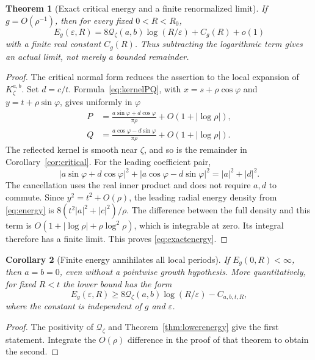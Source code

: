 \documentclass[11pt,a4paper]{article}
\numberwithin{equation}{section}
\newtheorem{theorem}{Theorem}[section]
\newtheorem{corollary}[theorem]{Corollary}
\theoremstyle{definition}
\theoremstyle{remark}
\newcommand{\qf}{\mathcal Q}
\begin{document}
\begin{theorem}[Exact critical energy and a finite renormalized limit]
\label{thm:exactenergy}
If $g=O(\rho^{-1})$, then for every fixed $0<R<R_0$,
\begin{equation}
 E_g(\varepsilon,R)
 =8\qf_\zeta(a,b)\log(R/\varepsilon)+C_g(R)+o(1)
 \label{eq:exactenergy}
\end{equation}
with a finite real constant $C_g(R)$. Thus subtracting the logarithmic
term gives an actual limit, not merely a bounded remainder.
\end{theorem}
\begin{proof}
The critical normal form reduces the assertion to the local expansion of
$K_\zeta^{a,b}$. Set $d=c/t$. Formula~\eqref{eq:kernelPQ}, with
$x=s+\rho\cos\varphi$ and $y=t+\rho\sin\varphi$, gives uniformly in
$\varphi$
\begin{align}
 P&=\frac{a\sin\varphi+d\cos\varphi}{\pi\rho}
          +O(1+|\log\rho|),\\
 Q&=\frac{a\cos\varphi-d\sin\varphi}{\pi\rho}
          +O(1+|\log\rho|).
 \label{eq:leadingPQ}
\end{align}
The reflected kernel is smooth near $\zeta$, and so is the remainder
in Corollary~\ref{cor:critical}. For the leading coefficient pair,
\[
 |a\sin\varphi+d\cos\varphi|^2
 +|a\cos\varphi-d\sin\varphi|^2=|a|^2+|d|^2.
\]
The cancellation uses the real inner product and does not require $a,d$
to commute. Since $y^2=t^2+O(\rho)$, the leading radial energy density
from \eqref{eq:energy} is
$8(t^2|a|^2+|c|^2)/\rho$.
The difference between the full density and this term is
$O(1+|\log\rho|+\rho\log^2\rho)$, which is integrable at zero.
Its integral therefore has a finite limit. This proves
\eqref{eq:exactenergy}.
\end{proof}

\begin{corollary}[Finite energy annihilates all local periods]
If $E_g(0,R)<\infty$, then $a=b=0$, even without a pointwise growth
hypothesis. More quantitatively, for fixed $R<t$ the lower bound has
the form
\[
 E_g(\varepsilon,R)\geq
 8\qf_\zeta(a,b)\log(R/\varepsilon)-C_{a,b,t,R},
\]
where the constant is independent of $g$ and $\varepsilon$.
\end{corollary}
\begin{proof}
The positivity of $\qf_\zeta$ and
Theorem~\ref{thm:lowerenergy} give the first statement. Integrate the
$O(\rho)$ difference in the proof of that theorem to obtain the second.
\end{proof}
\end{document}
